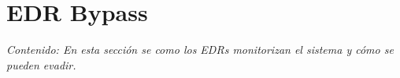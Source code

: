 \chapter{EDR Bypass}

\textit{Contenido: En esta sección se como los EDRs monitorizan el sistema y 
cómo se pueden evadir.}
\vspace{1em}





